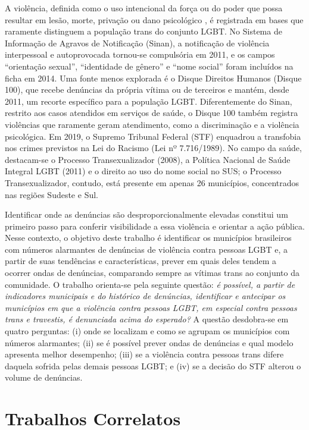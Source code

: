 \documentclass[12pt]{article}
\begin{document}
A violência, definida como o uso intencional da força ou do poder que possa resultar em lesão, morte, privação ou dano psicológico \cite{marinho_tomazelli_firianelli:2024}, é registrada em bases que raramente distinguem a população trans do conjunto LGBT. No Sistema de Informação de Agravos de Notificação (Sinan), a notificação de violência interpessoal e autoprovocada tornou-se compulsória em 2011, e os campos ``orientação sexual'', ``identidade de gênero'' e ``nome social'' foram incluídos na ficha em 2014. Uma fonte menos explorada é o Disque Direitos Humanos (Disque 100), que recebe denúncias da própria vítima ou de terceiros e mantém, desde 2011, um recorte específico para a população LGBT. Diferentemente do Sinan, restrito aos casos atendidos em serviços de saúde, o Disque 100 também registra violências que raramente geram atendimento, como a discriminação e a violência psicológica. Em 2019, o Supremo Tribunal Federal (STF) enquadrou a transfobia nos crimes previstos na Lei do Racismo (Lei nº 7.716/1989). No campo da saúde, destacam-se o Processo Transexualizador (2008), a Política Nacional de Saúde Integral LGBT (2011) e o direito ao uso do nome social no SUS; o Processo Transexualizador, contudo, está presente em apenas 26 municípios, concentrados nas regiões Sudeste e Sul.

Identificar onde as denúncias são desproporcionalmente elevadas constitui um primeiro passo para conferir visibilidade a essa violência e orientar a ação pública. Nesse contexto, o objetivo deste trabalho é identificar os municípios brasileiros com números alarmantes de denúncias de violência contra pessoas LGBT e, a partir de suas tendências e características, prever em quais deles tendem a ocorrer ondas de denúncias, comparando sempre as vítimas trans ao conjunto da comunidade. O trabalho orienta-se pela seguinte questão: \textit{é possível, a partir de indicadores municipais e do histórico de denúncias, identificar e antecipar os municípios em que a violência contra pessoas LGBT, em especial contra pessoas trans e travestis, é denunciada acima do esperado?} A questão desdobra-se em quatro perguntas: (i) onde se localizam e como se agrupam os municípios com números alarmantes; (ii) se é possível prever ondas de denúncias e qual modelo apresenta melhor desempenho; (iii) se a violência contra pessoas trans difere daquela sofrida pelas demais pessoas LGBT; e (iv) se a decisão do STF alterou o volume de denúncias.


\clearpage
\section{Trabalhos Correlatos}
\label{sec:correlatos}
\end{document}
